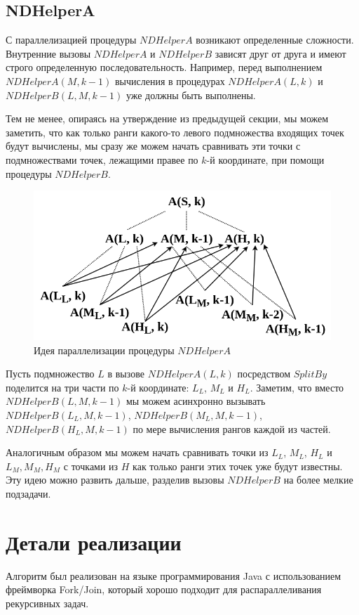 \subsection{NDHelperA}
С параллелизацией процедуры $NDHelperA$ возникают определенные сложности.
Внутренние вызовы $NDHelperA$ и $NDHelperB$ зависят друг от друга и имеют строго определенную последовательность. 
Например, перед выполнением $NDHelperA(M, k-1)$ вычисления в процедурах $NDHelperA(L, k)$ и $NDHelperB(L, M, k-1)$ уже должны быть выполнены.

Тем не менее, опираясь на утверждение из предыдущей секции, мы можем заметить, что как только ранги какого-то левого подмножества входящих точек будут вычислены, мы сразу же можем начать сравнивать эти точки с подмножествами точек, лежащими правее по $k$-й координате, при помощи процедуры $NDHelperB$.

\begin{figure}[h]
\centering
\includegraphics[width=\textwidth]{images/async.png}
\caption{Идея параллелизации процедуры $NDHelperA$}
\end{figure}

Пусть подмножество $L$ в вызове $NDHelperA(L, k)$ посредством $SplitBy$ поделится на три части по $k$-й координате: $L_L$, $M_L$ и $H_L$.
Заметим, что вместо $NDHelperB(L, M, k-1)$ мы можем асинхронно вызывать $NDHelperB(L_L, M, k-1)$, $NDHelperB(M_L, M, k-1)$, $NDHelperB(H_L, M, k-1)$ по мере вычисления рангов каждой из частей.

Аналогичным образом мы можем начать сравнивать точки из $L_L$, $M_L$, $H_L$ и $L_M, M_M, H_M$ с точками из $H$ как только ранги этих точек уже будут известны.
Эту идею можно развить дальше, разделив вызовы $NDHelperB$ на более мелкие подзадачи.

\section{Детали реализации}
Алгоритм был реализован на языке программирования Java с использованием фреймворка Fork/Join, который хорошо подходит для распараллеливания рекурсивных задач.

